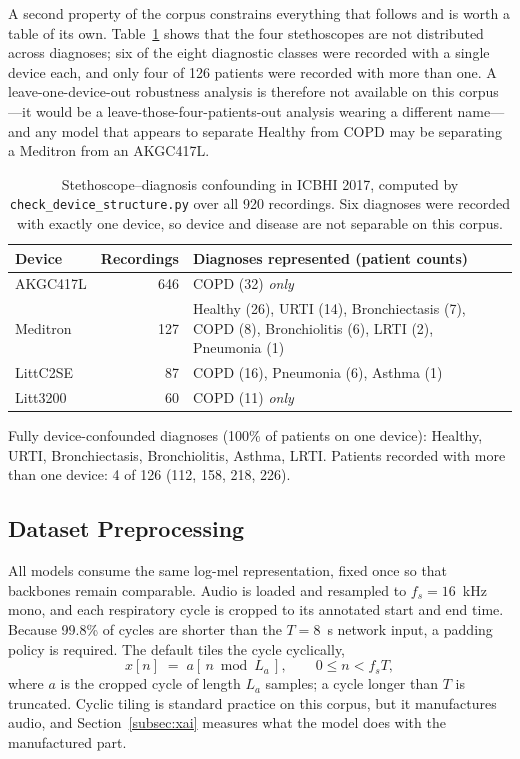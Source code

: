 \documentclass[journal,onecolumn]{IEEEtran}
\begin{document}
A second property of the corpus constrains everything that follows and is worth a
table of its own. Table~\ref{tab:device} shows that the four stethoscopes are not
distributed across diagnoses; six of the eight diagnostic classes were recorded
with a single device each, and only four of 126 patients were recorded with more
than one. A leave-one-device-out robustness analysis is therefore not available on
this corpus---it would be a leave-those-four-patients-out analysis wearing a
different name---and any model that appears to separate Healthy from COPD may be
separating a Meditron from an AKGC417L.

\begin{table}[!t]
\centering
\caption{Stethoscope--diagnosis confounding in ICBHI 2017, computed by
\texttt{check\_device\_structure.py} over all 920 recordings. Six diagnoses were
recorded with exactly one device, so device and disease are not separable on this
corpus.}
\label{tab:device}
\small
\begin{tabular}{lrl}
\toprule
Device & Recordings & Diagnoses represented (patient counts) \\
\midrule
AKGC417L & 646 & COPD (32) \emph{only} \\
Meditron & 127 & Healthy (26), URTI (14), Bronchiectasis (7), COPD (8), Bronchiolitis (6), LRTI (2), Pneumonia (1) \\
LittC2SE & \phantom{0}87 & COPD (16), Pneumonia (6), Asthma (1) \\
Litt3200 & \phantom{0}60 & COPD (11) \emph{only} \\
\bottomrule
\end{tabular}

\vspace{2pt}
\footnotesize Fully device-confounded diagnoses (100\% of patients on one
device): Healthy, URTI, Bronchiectasis, Bronchiolitis, Asthma, LRTI. Patients
recorded with more than one device: 4 of 126 (112, 158, 218, 226).
\end{table}

\subsection{Dataset Preprocessing}
\label{subsec:preprocessing}

All models consume the same log-mel representation, fixed once so that backbones
remain comparable. Audio is loaded and resampled to $f_s=16$~kHz mono, and each
respiratory cycle is cropped to its annotated start and end time. Because 99.8\%
of cycles are shorter than the $T=8$~s network input, a padding policy is required.
The default tiles the cycle cyclically,
\begin{equation}
x[n] \;=\; a\!\left[\,n \bmod L_a\,\right], \qquad 0 \leq n < f_s T ,
\label{eq:wrap}
\end{equation}
where $a$ is the cropped cycle of length $L_a$ samples; a cycle longer than $T$ is
truncated. Cyclic tiling is standard practice on this corpus, but it manufactures
audio, and Section~\ref{subsec:xai} measures what the model does with the
manufactured part.
\end{document}
